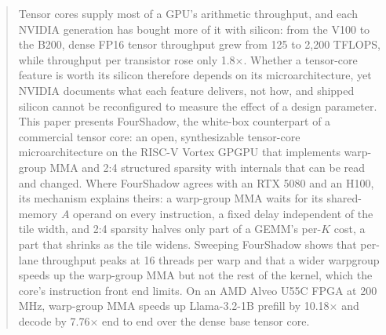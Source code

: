 \begin{abstract}
Tensor cores supply most of a GPU's arithmetic throughput, and each NVIDIA generation has bought more of it with silicon: from the V100 to the B200, dense FP16 tensor throughput grew from 125 to 2,200 TFLOPS, while throughput per transistor rose only 1.8$\times$. Whether a tensor-core feature is worth its silicon therefore depends on its microarchitecture, yet NVIDIA documents what each feature delivers, not how, and shipped silicon cannot be reconfigured to measure the effect of a design parameter. This paper presents FourShadow, the white-box counterpart of a commercial tensor core: an open, synthesizable tensor-core microarchitecture on the RISC-V Vortex GPGPU that implements warp-group MMA and 2:4 structured sparsity with internals that can be read and changed. Where FourShadow agrees with an RTX 5080 and an H100, its mechanism explains theirs: a warp-group MMA waits for its shared-memory $A$ operand on every instruction, a fixed delay independent of the tile width, and 2:4 sparsity halves only part of a GEMM's per-$K$ cost, a part that shrinks as the tile widens. Sweeping FourShadow shows that per-lane throughput peaks at 16 threads per warp and that a wider warpgroup speeds up the warp-group MMA but not the rest of the kernel, which the core's instruction front end limits. On an AMD Alveo U55C FPGA at 200\,MHz, warp-group MMA speeds up Llama-3.2-1B prefill by 10.18$\times$ and decode by 7.76$\times$ end to end over the dense base tensor core.
\end{abstract}
